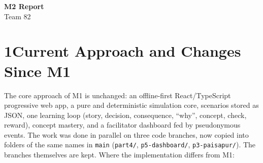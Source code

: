 \documentclass[10pt,a4paper]{article}
\begin{document}
\begin{center}
  {\LARGE\bfseries M2 Report}\\[4pt]
  {\large Team 82}
\end{center}
\vspace{-2pt}

\section*{1\quad Current Approach and Changes Since M1}

The core approach of M1 is unchanged: an offline-first React/TypeScript progressive web app, a pure and deterministic simulation core, scenarios stored as JSON, one learning loop (story, decision, consequence, ``why'', concept, check, reward), concept mastery, and a facilitator dashboard fed by pseudonymous events. The work was done in parallel on three code branches, now copied into folders of the same names in \texttt{main} (\texttt{part4/}, \texttt{p5-dashboard/}, \texttt{p3-paisapur/}). The branches themselves are kept. Where the implementation differs from M1:
\end{document}
